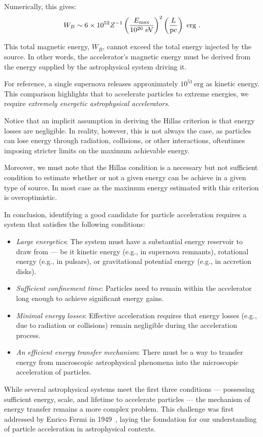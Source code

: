 Numerically, this gives:
\begin{equation}
W_B \sim 6 \times 10^{52} Z^{-1} \left( \frac{E_{\rm max}}{10^{20}~\text{eV}} \right)^2 \left( \frac{L}{\text{pc}} \right)~\text{erg}~.
\end{equation}

This total magnetic energy, \( W_B \), cannot exceed the total energy injected by the source. In other words, the accelerator’s magnetic energy must be derived from the energy supplied by the astrophysical system driving it.

For reference, a single supernova releases approximately \( 10^{51} \, \text{erg} \) as kinetic energy. This comparison highlights that to accelerate particles to extreme energies, we require \emph{extremely energetic astrophysical accelerators}.

Notice that an implicit assumption in deriving the Hillas criterion is that energy losses are negligible. In reality, however, this is not always the case, as particles can lose energy through radiation, collisions, or other interactions, oftentimes imposing stricter limits on the maximum achievable energy.

Moreover, we must note that the Hillas condition is a necessary but not suﬃcient condition to estimate whether or not a given energy can be achieve in a given type of source. In most case as the maximum energy estimated with this criterion is overoptimistic. 

In conclusion, identifying a good candidate for particle acceleration requires a system that satisfies the following conditions:  
\begin{itemize}
\item \emph{Large energetics}: The system must have a substantial energy reservoir to draw from --- be it kinetic energy (e.g., in supernova remnants), rotational energy (e.g., in pulsars), or gravitational potential energy (e.g., in accretion disks).
\item \emph{Sufficient confinement time}: Particles need to remain within the accelerator long enough to achieve significant energy gains.
\item \emph{Minimal energy losses}: Effective acceleration requires that energy losses (e.g., due to radiation or collisions) remain negligible during the acceleration process.
\item \emph{An efficient energy transfer mechanism}: There must be a way to transfer energy from macroscopic astrophysical phenomena into the microscopic acceleration of particles.
\end{itemize}

While several astrophysical systems meet the first three conditions --- possessing sufficient energy, scale, and lifetime to accelerate particles --- the mechanism of energy transfer remains a more complex problem. This challenge was first addressed by Enrico Fermi in 1949~\cite{}, laying the foundation for our understanding of particle acceleration in astrophysical contexts.
